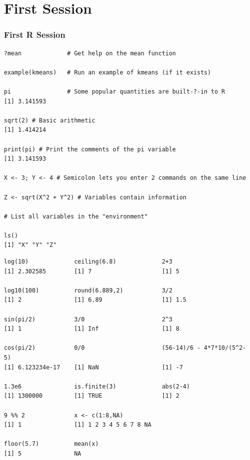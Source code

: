\documentclass{beamer}
\begin{document}
\section{First Session}


\begin{frame}[fragile]
\frametitle{First R Session}
\footnotesize
\begin{verbatim}
?mean             # Get help on the mean function

example(kmeans)   # Run an example of kmeans (if it exists)

pi                # Some popular quantities are built-?‐in to R
[1] 3.141593

sqrt(2) # Basic arithmetic
[1] 1.414214

print(pi) # Print the comments of the pi variable
[1] 3.141593

X <- 3; Y <- 4 # Semicolon lets you enter 2 commands on the same line

Z <- sqrt(X^2 + Y^2) # Variables contain information

# List all variables in the "environment"

ls()
[1] "X" "Y" "Z"
\end{verbatim}
\end{frame}


\begin{frame}[fragile]
\footnotesize
\begin{verbatim}
log(10)             ceiling(6.8)             2+3
[1] 2.302585        [1] 7                    [1] 5

log10(100)          round(6.889,2)           3/2
[1] 2               [1] 6.89                 [1] 1.5

sin(pi/2)           3/0                      2^3 
[1] 1               [1] Inf                  [1] 8
 
cos(pi/2)           0/0                      (56-14)/6 - 4*7*10/(5^2-5)
[1] 6.123234e-17    [1] NaN                  [1] -7

1.3e6               is.finite(3)             abs(2-4)
[1] 1300000         [1] TRUE                 [1] 2

9 %% 2              x <- c(1:8,NA)           
[1] 1               [1] 1 2 3 4 5 6 7 8 NA

floor(5.7)          mean(x)
[1] 5               NA
\end{verbatim}
\end{frame}
\end{document}
